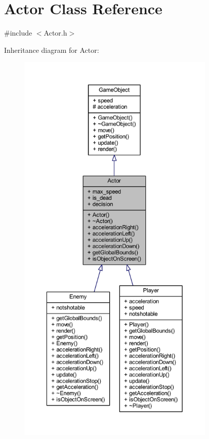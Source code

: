 \hypertarget{class_actor}{}\section{Actor Class Reference}
\label{class_actor}


{\ttfamily \#include $<$Actor.\+h$>$}



Inheritance diagram for Actor\+:
\nopagebreak
\begin{figure}[H]
\begin{center}
\leavevmode
\includegraphics[height=550pt]{class_actor__inherit__graph}
\end{center}
\end{figure}


